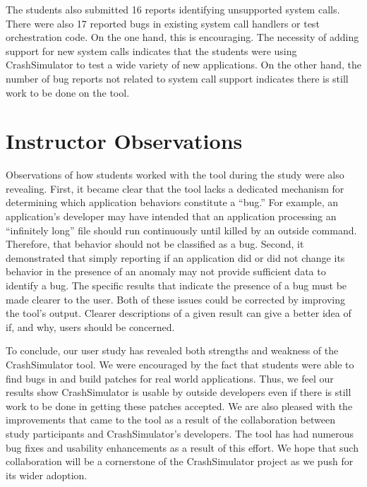The students also submitted 16 reports identifying unsupported system calls. There were also 17 reported bugs in
existing system call handlers or test orchestration code.
On the one hand, this is encouraging.  The necessity of adding
support for new system calls
indicates that the students were
using CrashSimulator to test a wide variety of new applications.
On the other hand, the number of bug reports not related to system call support
indicates there is still work to be done on the tool.


\section{Instructor Observations}
\label{subsec:tool-shortcomings}
Observations of how students worked  with the tool during the study were also revealing.
First,
it became clear that the tool
lacks a dedicated mechanism
for determining
which application behaviors constitute a ``bug.''
For example, an application's developer
may have intended that an application processing an ``infinitely long'' file should run continuously
until killed by an outside command.
Therefore, that behavior should not be classified as a bug.
Second,
it demonstrated that
simply reporting if an application did or did not change its behavior
in the presence of an anomaly may not provide sufficient data to identify a bug. The specific results that indicate the presence of a bug must be made clearer to the user.
Both of these issues could be corrected 
by improving the tool's output.
Clearer descriptions of a given result
can give a better idea of
if,
and why,
users should be concerned.

To conclude, our user study has revealed both strengths and weakness
of the CrashSimulator tool.
We were encouraged by the fact that students were able to find bugs in and build patches for real world applications.
Thus, we feel our results show CrashSimulator is usable by outside developers even if there is still work to be done in getting these patches accepted. 
We are also pleased with the improvements that came to the tool as a result of the collaboration between study participants and CrashSimulator's developers.
The tool has had numerous bug fixes and usability enhancements as a result of this effort.
We hope that such collaboration will be a cornerstone of the CrashSimulator project as we push for its wider adoption.

